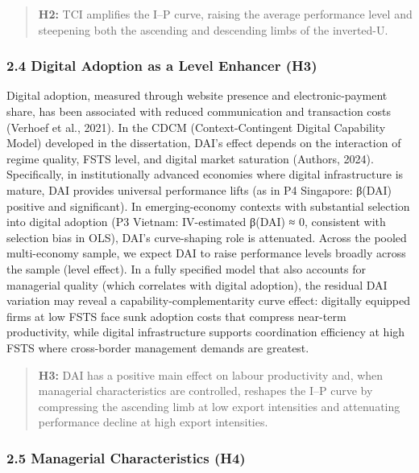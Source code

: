 \documentclass[
  12pt,a4paper]{article}
\begin{document}
\begin{quote}
\textbf{H2:} TCI amplifies the I--P curve, raising the average
performance level and steepening both the ascending and descending limbs
of the inverted-U.
\end{quote}

\hypertarget{digital-adoption-as-a-level-enhancer-h3}{%
\subsubsection{2.4 Digital Adoption as a Level Enhancer
(H3)}\label{digital-adoption-as-a-level-enhancer-h3}}

Digital adoption, measured through website presence and
electronic-payment share, has been associated with reduced communication
and transaction costs (Verhoef et al., 2021). In the CDCM
(Context-Contingent Digital Capability Model) developed in the
dissertation, DAI's effect depends on the interaction of regime quality,
FSTS level, and digital market saturation (Authors, 2024). Specifically,
in institutionally advanced economies where digital infrastructure is
mature, DAI provides universal performance lifts (as in P4 Singapore:
β(DAI) positive and significant). In emerging-economy contexts with
substantial selection into digital adoption (P3 Vietnam: IV-estimated
β(DAI) ≈ 0, consistent with selection bias in OLS), DAI's curve-shaping
role is attenuated. Across the pooled multi-economy sample, we expect
DAI to raise performance levels broadly across the sample (level
effect). In a fully specified model that also accounts for managerial
quality (which correlates with digital adoption), the residual DAI
variation may reveal a capability-complementarity curve effect:
digitally equipped firms at low FSTS face sunk adoption costs that
compress near-term productivity, while digital infrastructure supports
coordination efficiency at high FSTS where cross-border management
demands are greatest.

\begin{quote}
\textbf{H3:} DAI has a positive main effect on labour productivity and,
when managerial characteristics are controlled, reshapes the I--P curve
by compressing the ascending limb at low export intensities and
attenuating performance decline at high export intensities.
\end{quote}

\hypertarget{managerial-characteristics-h4}{%
\subsubsection{2.5 Managerial Characteristics
(H4)}\label{managerial-characteristics-h4}}
\end{document}
